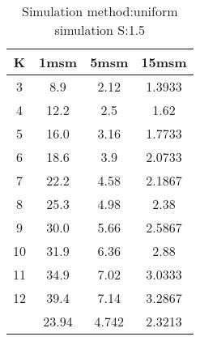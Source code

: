 \begin{table}[H]
\centering
\begin{tabular}{c|ccc}
K &1msm &5msm &15msm\\
\hline
3 & 8.9 & 2.12 & 1.3933\\
4 & 12.2 & 2.5 & 1.62\\
5 & 16.0 & 3.16 & 1.7733\\
6 & 18.6 & 3.9 & 2.0733\\
7 & 22.2 & 4.58 & 2.1867\\
8 & 25.3 & 4.98 & 2.38\\
9 & 30.0 & 5.66 & 2.5867\\
10 & 31.9 & 6.36 & 2.88\\
11 & 34.9 & 7.02 & 3.0333\\
12 & 39.4 & 7.14 & 3.2867\\
\hline
& 23.94 & 4.742 & 2.3213\\
\end{tabular}
\caption{Simulation method:uniform simulation S:1.5}
\label{tab:s1.5}
\end{table}
